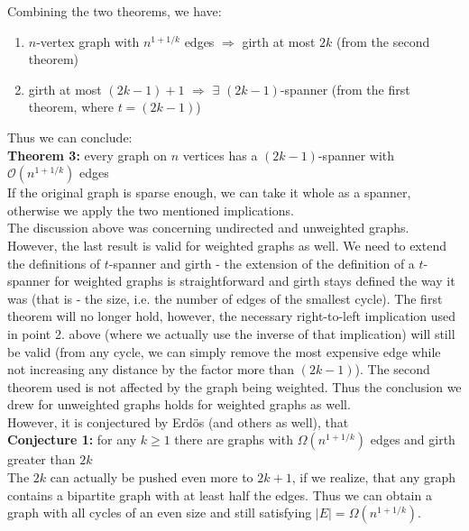 \documentclass[a4paper]{article}
\begin{document}
        Combining the two theorems, we have: \\

        \begin{enumerate}
            \item $n$-vertex graph with $n^{1 + 1/k}$ edges $\Rightarrow$ girth at most $2k$ (from the second theorem)
            \item girth at most $(2k - 1) + 1$ $\Rightarrow$ $\exists$ $(2k - 1)$-spanner (from the first theorem, where $t = (2k - 1)$)
        \end{enumerate}
        {\hfill}

        Thus we can conclude: \\

        \textbf{Theorem 3:} \def\reseveryspanner{every graph on $n$ vertices has a $(2k - 1)$-spanner with $\mathcal{O}(n^{1 + 1/k})$ edges}\reseveryspanner \\

        If the original graph is sparse enough, we can take it whole as a spanner, otherwise we apply the two mentioned implications. \\

        The discussion above was concerning undirected and unweighted graphs. However, the last result is valid for weighted graphs as well. We need to extend the definitions of $t$-spanner and girth - the extension of the definition of a $t$-spanner for weighted graphs is straightforward and girth stays defined the way it was (that is - the size, i.e. the number of edges of the smallest cycle). The first theorem will no longer hold, however, the necessary right-to-left implication used in point 2. above (where we actually use the inverse of that implication) will still be valid (from any cycle, we can simply remove the most expensive edge while not increasing any distance by the factor more than $(2k - 1)$). The second theorem used is not affected by the graph being weighted. Thus the conclusion we drew for unweighted graphs holds for weighted graphs as well. \\

        However, it is conjectured by Erd\"{o}s (and others as well), that \\

        \textbf{Conjecture 1:} \def\reserdos{for any $k \geq 1$ there are graphs with $\Omega(n^{1 + 1/k})$ edges and girth greater than $2k$}\reserdos \\

        The $2k$ can actually be pushed even more to $2k + 1$, if we realize, that any graph contains a bipartite graph with at least half the edges. Thus we can obtain a graph with all cycles of an even size and still satisfying $|E| = \Omega(n^{1 + 1/k})$. \\
\end{document}
